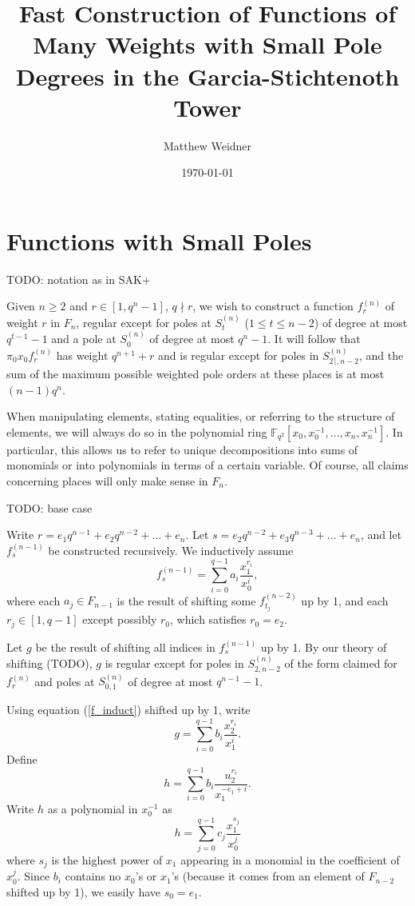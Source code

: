 \documentclass[12pt]{article}
\newcommand{\mb}[1]{\ensuremath{\mathbb{#1}}}
\newcommand{\F}{\mb{F}}
\theoremstyle{plain}
\theoremstyle{definition}
\begin{document}
\title{Fast Construction of Functions of Many Weights with Small Pole Degrees in the Garcia-Stichtenoth Tower}
\author{Matthew Weidner}
\date{\today}
\maketitle
\vspace{-10pt}


\section{Functions with Small Poles}
TODO: notation as in SAK+

Given $n \ge 2$ and $r \in [1, q^n - 1]$, $q \nmid r$, we wish to construct a function $f^{(n)}_r$ of weight $r$ in $F_n$, regular except for poles at $S^{(n)}_t$ ($1 \le t \le n-2$) of degree at most $q^{t-1} - 1$ and a pole at $S^{(n)}_0$ of degree at most $q^n - 1$.  It will follow that $\pi_0 x_0 f^{(n)}_r$ has weight $q^{n+1} + r$ and is regular except for poles in $S^{(n)}_{2 \rceil, n-2}$, and the sum of the maximum possible weighted pole orders at these places is at most $(n-1)q^n$.

When manipulating elements, stating equalities, or referring to the structure of elements, we will always do so in the polynomial ring $\F_{q^2}[x_0, x_0^{-1}, \dots, x_n, x_n^{-1}]$.  In particular, this allows us to refer to unique decompositions into sums of monomials or into polynomials in terms of a certain variable.  Of course, all claims concerning places will only make sense in $F_n$.

TODO: base case

Write $r = e_1 q^{n-1} + e_2 q^{n-2} + \dots + e_n$.  Let $s = e_2 q^{n-2} + e_3 q^{n-3} + \dots + e_n$, and let $f^{(n-1)}_s$ be constructed recursively.  We inductively assume
\begin{equation}\label{f_induct}
f^{(n-1)}_s = \sum_{i=0}^{q-1} a_i \frac{x_1^{r_i}}{x_0^i},
\end{equation}
where each $a_j \in F_{n-1}$ is the result of shifting some $f^{(n-2)}_{t_j}$ up by 1, and each $r_j \in [1, q-1]$ except possibly $r_0$, which satisfies $r_0 = e_2$.

Let $g$ be the result of shifting all indices in $f^{(n-1)}_s$ up by 1.  By our theory of shifting (TODO), $g$ is regular except for poles in $S^{(n)}_{2, n-2}$ of the form claimed for $f^{(n)}_r$ and poles at $S^{(n)}_{0, 1}$ of degree at most $q^{n-1} - 1$.

Using equation (\ref{f_induct}) shifted up by 1, write
\[
g = \sum_{i=0}^{q-1} b_i \frac{x_2^{r_i}}{x_1^i}.
\]
Define
\[
h = \sum_{i=0}^{q-1} b_i \frac{u_2^{r_i}}{x_1^{-e_1 + i}}.
\]
Write $h$ as a polynomial in $x_0^{-1}$ as
\[
h = \sum_{j=0}^{q-1} c_j \frac{x_1^{s_j}}{x_0^j}
\]
where $s_j$ is the highest power of $x_1$ appearing in a monomial in the coefficient of $x_0^{j}$.  Since $b_i$ contains no $x_0$'s or $x_1$'s (because it comes from an element of $F_{n-2}$ shifted up by 1), we easily have $s_0 = e_1$.
\end{document}
